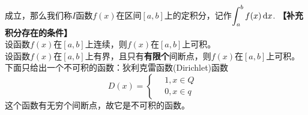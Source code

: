 \noindent 成立，那么我们称$I$函数$f(x)$在区间$[a,b]$上的定积分，记作$\displaystyle\int_{a}^{b}f(x)\,{\rm{d}} x$.
\warn[\hspace*{2em} 定积分的值只与被积函数和被积区间有关，而与积分变量的记法无关。例如
\begin{equation}
	\int_{a}^{b}f(x) \,\d x=\int_{a}^{b}f(t) \,\d t=\int_{a}^{b}f(u) \,\d u\vspace*{-1em}
	\end{equation}
\hspace*{2em} $\di\sum_{i=1}^{n}f(\xi_i)\Delta x_i$通常称为$f(x)$的积分和。如果$f(x)$在{$[a,b]$}上的定积分存在，那么就称$f(x)$在{$[a,b]$}上可积。]
\noindent \textbf{【补充\hspace{1em} 积分存在的条件】}\\

\vspace*{-1em}
\theorem[积分存在条件1]
设函数$f(x)$在$[a,b]$上连续，则$f(x)$在$[a,b]$上可积。\\

\vspace*{-1em}
\theorem[积分存在条件2]
设函数$f(x)$在$[a,b]$上有界，且只有\textbf{有限个}间断点，则$f(x)$在$[a,b]$上可积。
下面只给出一个不可积的函数：狄利克雷函数(Dirichlet)函数
\begin{equation}
	\nonumber
	D(x)=\left\{
		\begin{aligned}
			& \,1,x\in Q\\
			& \,0,x\in q&
		\end{aligned}
		\right.
\end{equation}
这个函数有无穷个间断点，故它是不可积的函数。

